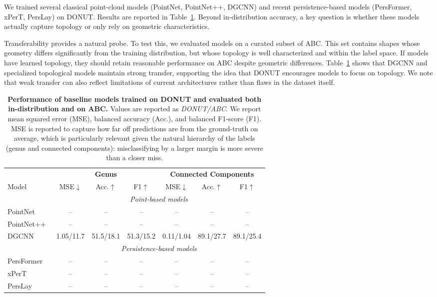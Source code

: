 We trained several classical point-cloud models (PointNet, PointNet++, DGCNN) and recent persistence-based models (PersFormer, xPerT, PersLay) on DONUT. Results are reported in Table~\ref{tab:topogen-results}. Beyond in-distribution accuracy, a key question is whether these models actually capture topology or only rely on geometric characteristics.

Transferability provides a natural probe. To test this, we evaluated models on a curated subset of ABC. This set contains shapes whose geometry differs significantly from the training distribution, but whose topology is well characterized and within the label space. If models have learned topology, they should retain reasonable performance on ABC despite geometric differences. Table~\ref{tab:topogen-results} shows that DGCNN and specialized topological models maintain strong transfer, supporting the idea that DONUT encourages models to focus on topology. We note that weak transfer can also reflect limitations of current architectures rather than flaws in the dataset itself.

\begin{table}[h]
\centering
\begin{tabular}{l|ccc|ccc}
\toprule
 & \multicolumn{3}{c|}{\textbf{Genus}} & \multicolumn{3}{c}{\textbf{Connected Components}} \\
Model & MSE$\downarrow$ & Acc.$\uparrow$ & F1$\uparrow$ & MSE$\downarrow$ & Acc.$\uparrow$ & F1$\uparrow$ \\
\midrule
\multicolumn{1}{l}{} & \multicolumn{6}{c}{\textit{Point-based models}} \\
\midrule
PointNet~\cite{pointnet}   & -- & -- & -- & -- & -- & -- \\
PointNet++~\cite{pointnet++} &  -- & -- & -- & -- & -- & -- \\
DGCNN~\cite{dgcnn}      & 1.05/11.7 & 51.5/18.1 & 51.3/15.2 & 0.11/1.04 & 89.1/27.7 & 89.1/25.4 \\
\midrule
\multicolumn{1}{l}{} & \multicolumn{6}{c}{\textit{Persistence-based models}} \\
\midrule
PersFormer~\cite{persformer} & -- & -- & -- & -- & -- & -- \\
xPerT~\cite{xpert}      & -- & -- & -- & -- & -- & -- \\
PersLay~\cite{perslay}    & -- & -- & -- & -- & -- & -- \\
\bottomrule
\end{tabular}
\caption{\textbf{Performance of baseline models trained on DONUT and evaluated both in-distribution and on ABC.} Values are reported as \textit{DONUT/ABC}. We report mean squared error (MSE), balanced accuracy (Acc.), and balanced F1-score (F1). MSE is reported to capture how far off predictions are from the ground-truth on average, which is particularly relevant given the natural hierarchy of the labels (genus and connected components): misclassifying by a larger margin is more severe than a closer miss. }
\label{tab:topogen-results}
\end{table}


